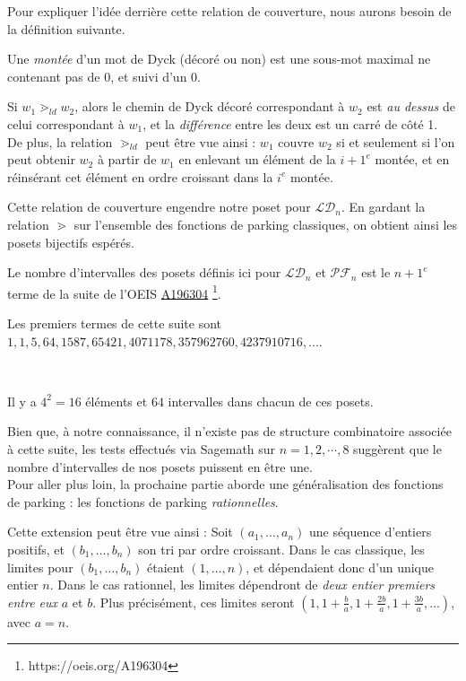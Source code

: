 Pour expliquer l'idée derrière cette relation de couverture, nous aurons
besoin de la définition suivante.

\begin{definition}[Montée]
    Une \emph{montée} d'un mot de Dyck (décoré ou non) est une sous-mot
    maximal ne contenant pas de 0, et suivi d'un 0.
\end{definition}

\begin{rem}
    Si $w_1 \gtrdot_{ld} w_2$, alors le chemin de Dyck décoré correspondant
    à $w_2$ est \emph{au dessus} de celui correspondant à $w_1$,
    et la \emph{différence} entre les deux est un carré de côté 1.\\
    De plus, la relation $\gtrdot_{ld}$ peut être vue ainsi :
    $w_1$ couvre $w_2$ si et seulement si l'on peut obtenir $w_2$ à partir
    de $w_1$ en enlevant un élément de la $i + 1^{e}$ montée, 
    et en réinsérant cet élément en ordre croissant dans la $i^{e}$
    montée.
\end{rem}

Cette relation de couverture engendre notre poset pour $\mathcal{LD}_n$.
En gardant la relation $\gtrdot$ sur l'ensemble des fonctions de parking
classiques, on obtient ainsi les posets bijectifs espérés.


\begin{conj}
    Le nombre d'intervalles des posets définis ici pour $\mathcal{LD}_n$
    et $\mathcal{PF}_n$ est le $n+1^{e}$ terme de la suite de l'OEIS
    \href{https://oeis.org/A196304}{A196304}
    \footnote{https://oeis.org/A196304}.
\end{conj}

Les premiers termes de cette suite sont $1, 1, 5, 64, 1587,
65421, 4071178, 357962760, 4237910716, ...$.

\begin{expl}
    ~\\
    \begin{center}
        
        Il y a $4^2 = 16$ éléments et $64$ intervalles dans chacun de ces
        posets.
    \end{center}
\end{expl}

Bien que, à notre connaissance, il n'existe pas de structure combinatoire
associée à cette suite, les tests effectués via Sagemath sur
$n = 1, 2, \cdots, 8$ suggèrent que le nombre d'intervalles de nos posets
puissent en être une.\\

Pour aller plus loin, la prochaine partie aborde une généralisation des
fonctions de parking : les fonctions de parking \emph{rationnelles}.

Cette extension peut être vue ainsi :
Soit $(a_1, \ldots, a_n)$ une séquence d'entiers positifs,
et $(b_1, \ldots, b_n)$ son tri par ordre croissant.
Dans le cas classique, les limites pour $(b_1, \ldots, b_n)$
étaient $(1, \ldots, n)$, et dépendaient donc d'un unique entier $n$.
Dans le cas rationnel, les limites dépendront de \emph{deux entier
premiers entre eux} $a$ et $b$.
Plus précisément, ces limites seront $(1, 1 + \frac{b}{a},
1 + \frac{2b}{a}, 1 + \frac{3b}{a}, \ldots)$, avec $a = n$. 